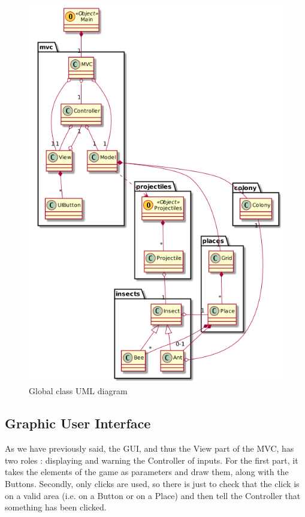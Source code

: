 \documentclass[a4paper]{article}
\begin{document}
\begin{figure}[H]
	\centering
	\includegraphics[scale=0.7]{classDiagram.png}
	\caption{Global class UML diagram}
	\label{classDiagram}
\end{figure}

	\subsection{Graphic User Interface}
	As we have previously said, the GUI, and thus the View part of the MVC, has two roles : displaying and warning the Controller of inputs. For the first part, it takes the elements of the game as parameters and draw them, along with the Buttons. Secondly, only clicks are used, so there is just to check that the click is on a valid area (i.e. on a Button or on a Place) and then tell the Controller that something has been clicked.
	
\end{document}
